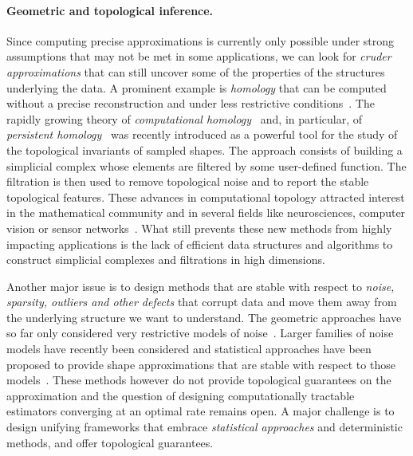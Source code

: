 \paragraph{Geometric and topological inference.}
Since computing precise approximations is currently only possible under strong assumptions that may not be met in some applications, we can look for {\em cruder approximations }
that can still  uncover some of the properties of the structures underlying the data.
%
%
A prominent example is {\em homology} that can be computed without a precise
reconstruction and under less restrictive
conditions~\cite{geometrica-ccl09,nsw-fhm-2008}. The rapidly growing
theory of {\em computational homology}~\cite{kmm-ch-2003} and, in particular, of {\em persistent homology}~\cite{eh-ph-2008,rg-bptd-2008,az-tfc-2009} was
recently introduced as a powerful tool for the study of the
topological invariants of sampled shapes. The approach consists of
building a simplicial complex whose elements are filtered by some
user-defined function. The filtration is then used to remove
topological noise and to report the stable topological features.
These advances in computational topology attracted interest in the
mathematical community and in several fields like neurosciences,
computer vision or sensor
networks~\cite{fpgo-airc-2009,cids-lbsni-2008,dsrg-csnph-2007}.  What
still prevents these new methods from highly impacting applications is
the lack of efficient data structures and algorithms to construct
simplicial complexes and filtrations in high dimensions.

Another major issue is to design methods that are stable with respect
to {\em noise, sparsity, outliers and other defects} that corrupt data
and move them away from the underlying structure we want to
understand. The geometric approaches have so far only considered very restrictive models of noise~\cite{nsw-fhm-2008}.  Larger families of noise models have recently been considered and statistical approaches have been proposed to provide shape approximations that are stable with respect to those models~\cite{gpvw-mme-2011}. These methods however do not provide topological guarantees on the approximation and the question of designing computationally tractable estimators converging at an optimal rate remains open. A major challenge is to design unifying frameworks that embrace {\em statistical approaches} and deterministic methods, and offer topological guarantees.  

